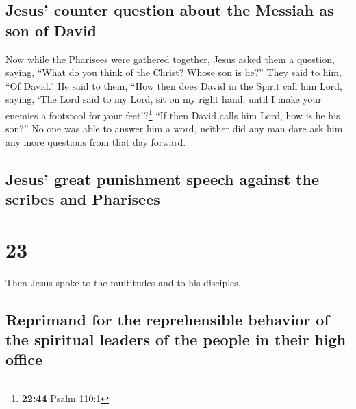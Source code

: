 \hypertarget{jesus-counter-question-about-the-messiah-as-son-of-david}{%
\subsection{Jesus' counter question about the Messiah as son of
David}\label{jesus-counter-question-about-the-messiah-as-son-of-david}}

 Now while the Pharisees were gathered together, Jesus
asked them a question,  saying, ``What do you think of
the Christ? Whose son is he?'' They said to him, ``Of David.''
 He said to them, ``How then does David in the Spirit
call him Lord, saying,  `The Lord said to my Lord, sit on
my right hand, until I make your enemies a footstool for your
feet'?\footnote{\textbf{22:44} Psalm 110:1}  ``If then
David calls him Lord, how is he his son?''  No one was
able to answer him a word, neither did any man dare ask him any more
questions from that day forward.

\hypertarget{jesus-great-punishment-speech-against-the-scribes-and-pharisees}{%
\subsection{Jesus' great punishment speech against the scribes and
Pharisees}\label{jesus-great-punishment-speech-against-the-scribes-and-pharisees}}

\hypertarget{section-22}{%
\section{23}\label{section-22}}

 Then Jesus spoke to the multitudes and to his disciples,

\hypertarget{reprimand-for-the-reprehensible-behavior-of-the-spiritual-leaders-of-the-people-in-their-high-office}{%
\subsection{Reprimand for the reprehensible behavior of the spiritual
leaders of the people in their high
office}\label{reprimand-for-the-reprehensible-behavior-of-the-spiritual-leaders-of-the-people-in-their-high-office}}

